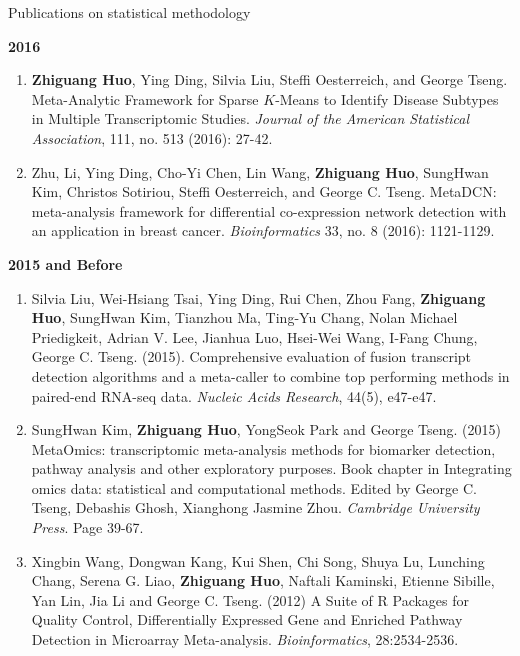\documentclass{resume} %
\begin{document}
\begin{rSection}{Publications on statistical methodology}
\begin{enumerate}[noitemsep,topsep=0pt, resume]
\end{enumerate}

\textbf{2016}
\begin{enumerate}[noitemsep,topsep=0pt,resume]

 \item  {\bf Zhiguang Huo}, Ying Ding, Silvia Liu, Steffi Oesterreich, and George Tseng. Meta-Analytic Framework for Sparse $K$-Means to Identify Disease Subtypes in Multiple Transcriptomic Studies. \emph{Journal of the American Statistical Association},  111, no. 513 (2016): 27-42.

\item 
Zhu, Li, Ying Ding, Cho-Yi Chen, Lin Wang,  {\bf Zhiguang Huo}, SungHwan Kim, Christos Sotiriou, Steffi Oesterreich, and George C. Tseng. MetaDCN: meta-analysis framework for differential co-expression network detection with an application in breast cancer. \emph{Bioinformatics} 33, no. 8 (2016): 1121-1129.
\end{enumerate}

\textbf{2015 and Before}
\begin{enumerate}[noitemsep,topsep=0pt,resume]
    \item Silvia Liu, Wei-Hsiang Tsai, Ying Ding, Rui Chen, Zhou Fang, {\bf Zhiguang Huo}, SungHwan Kim, Tianzhou Ma, Ting-Yu Chang, Nolan Michael Priedigkeit, Adrian V. Lee, Jianhua Luo, Hsei-Wei Wang, I-Fang Chung, George C. Tseng. (2015).
Comprehensive evaluation of fusion transcript detection algorithms and a meta-caller to combine top performing methods in paired-end RNA-seq data.
\emph{Nucleic Acids Research}, 44(5), e47-e47. 

\item SungHwan Kim,  {\bf Zhiguang Huo}, YongSeok Park and George Tseng.  (2015) MetaOmics: transcriptomic meta-analysis methods for biomarker detection, pathway analysis and other exploratory purposes. Book chapter in Integrating omics data: statistical and computational methods. Edited by George C. Tseng, Debashis Ghosh, Xianghong Jasmine Zhou. \emph{Cambridge University Press}. Page 39-67.

\item Xingbin Wang, Dongwan Kang, Kui Shen, Chi Song, Shuya Lu, Lunching Chang, Serena G. Liao, {\bf Zhiguang Huo}, Naftali Kaminski, Etienne Sibille, Yan Lin, Jia Li and George C. Tseng. (2012) A Suite of R Packages for Quality Control, Differentially Expressed Gene and Enriched Pathway Detection in Microarray Meta-analysis. \emph{Bioinformatics}, 28:2534-2536.

\end{enumerate}


\end{rSection}
\end{document}
